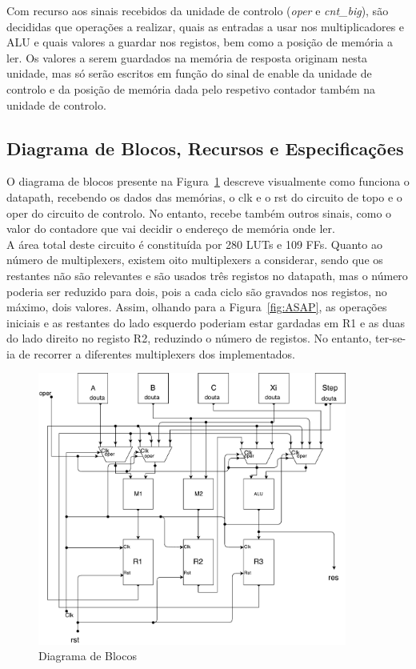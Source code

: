 \documentclass{article} %
\begin{document}
			\noindent Com recurso aos sinais recebidos da unidade de controlo (\emph{oper} e \emph{cnt\_big}), são decididas que operações a realizar, quais as entradas a usar nos multiplicadores e ALU e quais valores a guardar nos registos, bem como a posição de memória a ler. Os valores a serem guardados na memória de resposta originam nesta unidade, mas só serão escritos em função do sinal de enable da unidade de controlo e da posição de memória dada pelo respetivo contador também na unidade de controlo.
			

		\subsection{Diagrama de Blocos, Recursos e Especificações}
		O diagrama de blocos presente na Figura~\ref{fig:Diagrama} descreve visualmente como funciona o datapath, recebendo os dados das memórias, o clk e o rst do circuito de topo e o oper do circuito de controlo. No entanto, recebe também outros sinais, como o valor do contadore que vai decidir o endereço de memória onde ler.\\

		\noindent A área total deste circuito é constituída por 280 LUTs e 109 FFs. Quanto ao número de multiplexers, existem oito multiplexers a considerar, sendo que os restantes não são relevantes e são usados três registos no datapath, mas o número poderia ser reduzido para dois, pois a cada ciclo são gravados nos registos, no máximo, dois valores. Assim, olhando para a Figura~\ref{fig:ASAP}, as operações iniciais e as restantes do lado esquerdo poderiam estar gardadas em R1 e as duas do lado direito no registo R2, reduzindo o número de registos. No entanto, ter-se-ia de recorrer a diferentes multiplexers dos implementados.\\

		\begin{figure}[htbp]
			\begin{center}
				\includegraphics[width=4in]{Block.pdf}
				\caption{Diagrama de Blocos}
				\label{fig:Diagrama}
			\end{center}
		\end{figure}
\end{document}
